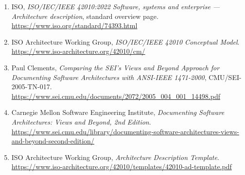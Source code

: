 \documentclass[11pt]{article}
\begin{document}
\begin{enumerate}[leftmargin=1.5em]
    \item ISO, \emph{ISO/IEC/IEEE 42010:2022 Software, systems and enterprise --- Architecture description}, standard overview page. \url{https://www.iso.org/standard/74393.html}
    \item ISO Architecture Working Group, \emph{ISO/IEC/IEEE 42010 Conceptual Model}. \url{https://www.iso-architecture.org/42010/cm/}
    \item Paul Clements, \emph{Comparing the SEI's Views and Beyond Approach for Documenting Software Architectures with ANSI-IEEE 1471-2000}, CMU/SEI-2005-TN-017. \url{https://www.sei.cmu.edu/documents/2072/2005_004_001_14498.pdf}
    \item Carnegie Mellon Software Engineering Institute, \emph{Documenting Software Architectures: Views and Beyond, 2nd Edition}. \url{https://www.sei.cmu.edu/library/documenting-software-architectures-views-and-beyond-second-edition/}
    \item ISO Architecture Working Group, \emph{Architecture Description Template}. \url{https://www.iso-architecture.org/42010/templates/42010-ad-template.pdf}
\end{enumerate}
\end{document}
